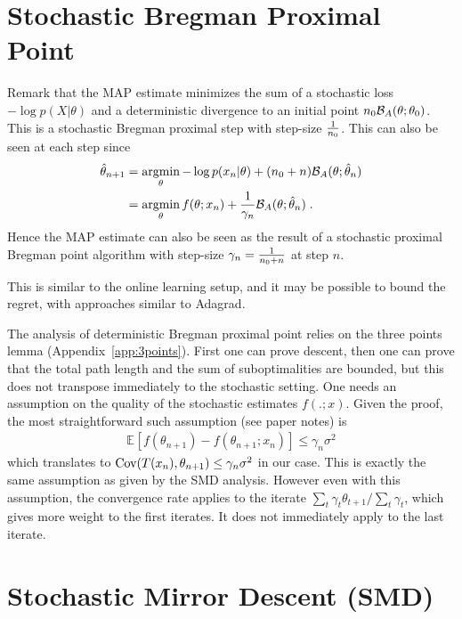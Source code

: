 \documentclass{article}
\newcommand*{\expect}[2][]{\ensuremath{\mathbb{E}_{#1} \left[ #2 \right] }} %
\newcommand{\logpart}{A}
\newcommand{\bregman}{\cB_\logpart}
\newcommand{\natp}{\theta}
\newcommand{\lr}{\gamma} %
\begin{document}
\section{Stochastic Bregman Proximal Point}
Remark that the MAP estimate minimizes the sum of a stochastic loss $ -\log p(X|\natp)$ and a deterministic divergence to an initial point $n_0 \bregman(\natp ; \natp_0)$. This is a stochastic Bregman proximal step with step-size $\frac{1}{n_0}$. This can also be seen at each step since
\begin{align}
    \hat \natp_{n+1} 
    &= \argmin_\natp -\log p(x_{n}|\natp) + (n_0 + n) \bregman(\natp ; \hat \natp_n) \\
    &= \argmin_\natp f(\natp; x_{n}) +  \inv{\gamma_{n}}\bregman(\natp ; \hat \natp_n) \; .
\end{align}
Hence the MAP estimate can also be seen as the result of a stochastic proximal Bregman point algorithm with step-size $\gamma_n = \frac{1}{n_0 + n}$ at step $n$.

This is similar to the online learning setup, and it may be possible to bound the regret, with approaches similar to Adagrad.

The analysis of deterministic Bregman proximal point relies on the three points lemma (Appendix~\ref{app:3points}). First one can prove descent, then one can prove that the total path length and the sum of suboptimalities are bounded, but this does not transpose immediately to the stochastic setting. One needs an assumption on the quality of the stochastic estimates $f(. ; x)$. 
Given the proof, the most straightforward such assumption (see paper notes) is 
\begin{align}
\expect{f(\natp_{n+1}) - f(\natp_{n+1} ; x_{n})} \leq \gamma_n \sigma^2
\end{align}
which translates to $\Cov(T(x_{n}) , \natp_{n+1}) \leq  \gamma_n \sigma^2$ in our case. This is exactly the same assumption as given by the SMD analysis. However even with this assumption, the convergence rate applies to the iterate $\sum_t \lr_t \natp_{t+1} / \sum_t \lr_t$, which gives more weight to the first iterates. It does not immediately apply to the last iterate.


\section{Stochastic Mirror Descent (SMD)}
\end{document}
